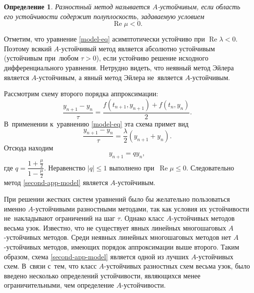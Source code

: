 \documentclass[11pt,a4paper,twoside,listtotoc,bibtotoc]{report}
\numberwithin{equation}{section}
\newtheorem*{definition}{Определение}
\theoremstyle{definition}
\theoremstyle{plain}
\begin{document}
%
\begin{figure}[H]
    \centering
\end{figure}
%

\begin{definition}
    Разностный метод называется $A$-устойчивым, если область его устойчивости
    содержит полуплоскость, задаваемую условием
    $$
        \operatorname{Re}\mu < 0.
    $$
\end{definition}
Отметим, что уравнение \eqref{model-eq} асимптотически устойчиво при
$\operatorname{Re}\lambda < 0.$ Поэтому всякий $A$-устойчивый метод является
абсолютно устойчивым (устойчивым при~любом $\tau > 0$), если устойчиво решение
исходного дифференциального уравнения.
Нетрудно видеть, что неявный метод Эйлера является $A$-устойчивым, а явный метод
Эйлера не~является $A$-устойчивым.

Рассмотрим схему второго порядка аппроксимации:
%
\begin{equation}
    \label{second-app-model}
    \dfrac{y_{n+1}-y_n}{\tau} = \dfrac{f(t_{n+1},y_{n+1}) + f(t_n,y_n)}{2}.
\end{equation}
%
В~применении к~уравнению \eqref{model-eq} эта схема примет вид
%
$$
    \dfrac{y_{n+1}-y_n}{\tau} = \frac{\lambda}{2}(y_{n+1}+y_n).
$$
%
Отсюда находим
%
$$
    y_{n+1}=qy_n,
$$
%
где $q=\dfrac{1+\frac{\mu}{2}}{1-\frac{\mu}{2}}.$ Неравенство
$|q|\leqslant1$
выполнено при~$\operatorname{Re}\mu\leqslant0$. Следовательно метод
\eqref{second-app-model} является $A$-устойчивым.

При решении жестких систем уравнений было бы желательно пользоваться именно
$A$-устойчивыми разностными методами, так как условия их устойчивости не~накладывают
ограничений на шаг $\tau$. Однако класс $A$-устойчивых методов весьма узок. Известно,
что не существует явных линейных многошаговых $A$-устойчивых методов.
Среди неявных линейных многошаговых методов нет $A$-устойчивых методов, имеющих
порядок аппроксимации выше второго. Таким образом, схема \eqref{second-app-model}
является одной из лучших $A$-устойчивых схем. В~связи с~тем, что класс $A$-устойчивых
разностных схем весьма узок, было введено
несколько определений устойчивости, являющихся менее ограничительными, чем определение
$A$-устойчивости.
\end{document}
